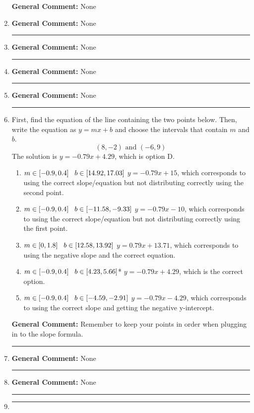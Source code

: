 \documentclass{extbook}[14pt]
\newcommand{\litem}[1]{\item#1\hspace*{-1cm}\rule{\textwidth}{0.4pt}}
\begin{document}
\begin{enumerate}
{\textbf{General Comment:} None
}
\litem{



\textbf{General Comment:} None
}
\litem{



\textbf{General Comment:} None
}
\litem{



\textbf{General Comment:} None
}
\litem{



\textbf{General Comment:} None
}
\litem{
First, find the equation of the line containing the two points below. Then, write the equation as $ y=mx+b $ and choose the intervals that contain $m$ and $b$.
\[ (8, -2) \text{ and } (-6, 9) \]
The solution is \( y = -0.79x + 4.29 \), which is option D.\begin{enumerate}[label=\Alph*.]
\item \( m \in [-0.9, 0.4] \hspace*{3mm} b \in [14.92, 17.03] \) $y = -0.79x + 15$, which corresponds to using the correct slope/equation but not distributing correctly using the second point.
\item \( m \in [-0.9, 0.4] \hspace*{3mm} b \in [-11.58, -9.33] \) $y = -0.79x -10$, which corresponds to using the correct slope/equation but not distributing correctly using the first point.
\item \( m \in [0, 1.8] \hspace*{3mm} b \in [12.58, 13.92] \) $y = 0.79x + 13.71$, which corresponds to using the negative slope and the correct equation.
\item \( m \in [-0.9, 0.4] \hspace*{3mm} b \in [4.23, 5.66] \)* $y = -0.79x + 4.29$, which is the correct option.
\item \( m \in [-0.9, 0.4] \hspace*{3mm} b \in [-4.59, -2.91] \) $y = -0.79x -4.29$, which corresponds to using the correct slope and getting the negative y-intercept.
\end{enumerate}

\textbf{General Comment:} Remember to keep your points in order when plugging in to the slope formula.
}
\litem{



\textbf{General Comment:} None
}
\litem{



\textbf{General Comment:} None
}
\litem{



}
\end{enumerate}
\end{document}
